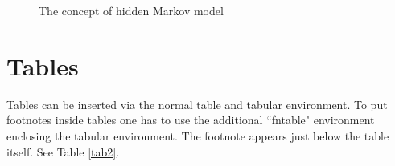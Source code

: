 \documentclass{CUP-JNL-DCE}
\begin{document}
\begin{figure}[!h]%
{\caption{The concept of hidden Markov model}\label{fig1}}
\vspace*{-22pt}
\end{figure}


\section{Tables}

Tables can be inserted via the normal table and tabular environment. To put
footnotes inside tables one has to use the additional ``fntable" environment
enclosing the tabular environment. The footnote appears just below the table
itself. See Table \ref{tab2}.

\end{document}
